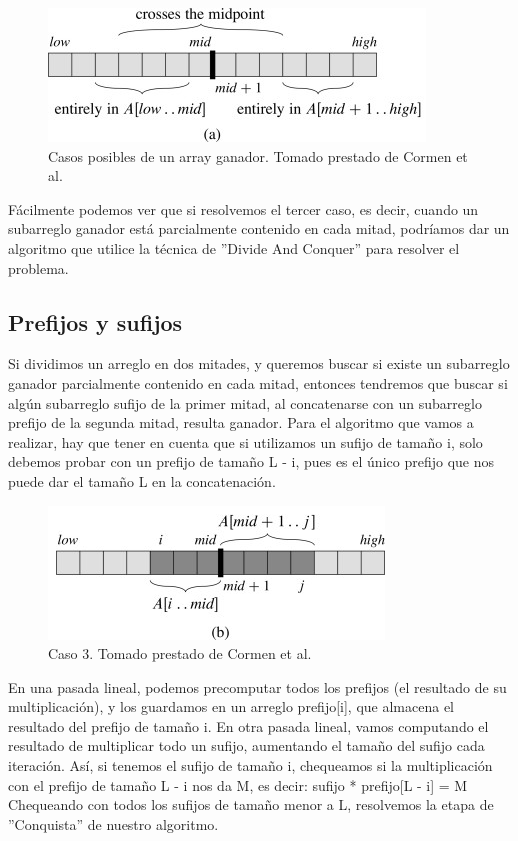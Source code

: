 \begin{figure}
  \centering
    \includegraphics[scale=3]{img/subarrays-casos.jpg}
  \caption {Casos posibles de un array ganador. Tomado prestado de Cormen et al.\cite{cormen_algo}}
\end{figure}

Fácilmente podemos ver que si resolvemos el tercer caso, es decir, cuando un subarreglo
ganador está parcialmente contenido en cada mitad, podríamos dar un algoritmo
que utilice la técnica de ''Divide And Conquer'' para resolver el problema.

\subsection{Prefijos y sufijos}
Si dividimos un arreglo en dos mitades, y queremos buscar si existe un subarreglo ganador
parcialmente contenido en cada mitad, entonces tendremos que buscar si algún subarreglo
sufijo de la primer mitad, al concatenarse con un subarreglo prefijo de la segunda mitad,
resulta ganador.
Para el algoritmo que vamos a realizar, hay que tener en cuenta que si utilizamos un
sufijo de tamaño i, solo debemos probar con un prefijo de tamaño L - i, pues es el único prefijo
que nos puede dar el tamaño L en la concatenación.



\begin{figure}
  \centering
    \includegraphics[scale=3]{img/subarrays-crossmid.jpg}
  \caption {Caso 3. Tomado prestado de Cormen et al.\cite{cormen_algo}}
\end{figure}

En una pasada lineal, podemos precomputar todos los prefijos (el resultado de su multiplicación),
y los guardamos en un arreglo prefijo[i], que almacena el resultado del prefijo de tamaño i.
\newline
En otra pasada lineal, vamos computando el resultado de multiplicar todo un sufijo, aumentando
el tamaño del sufijo cada iteración. Así, si tenemos el sufijo de tamaño i, chequeamos si
la multiplicación con el prefijo de tamaño L - i nos da M, es decir:
\newline
\newline
sufijo * prefijo[L - i] = M
\newline
\newline
Chequeando con todos los sufijos de tamaño menor a L, resolvemos la etapa de ''Conquista'' de nuestro
algoritmo.

